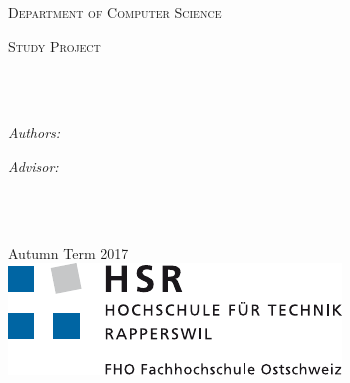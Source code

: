 \begin{titlepage}
\begin{center}

\vspace*{.06\textheight}
{\scshape\LARGE \univname\par} %

{\scshape\large Department of Computer Science\par}\vspace{1.2cm} %
\textsc{\Large Study Project}\\[0.5cm] %

\HRule \\[0.4cm] %
{\huge \bfseries \ttitle\par}\vspace{0.4cm} %
\HRule \\[1.5cm] %
 
\begin{minipage}[t]{0.4\textwidth}
\begin{flushleft} \large
\emph{Authors:}\\
\authorname %
\end{flushleft}
\end{minipage}
\begin{minipage}[t]{0.4\textwidth}
\begin{flushright} \large
\emph{Advisor:} \\
\supname \\[1cm]
\end{flushright}
\end{minipage}\\[3cm]
 
\vfill

{\large Autumn Term 2017}\\[4cm] %
\includegraphics{resources/logo_hsr} %
 
\vfill
\end{center}
\end{titlepage}

